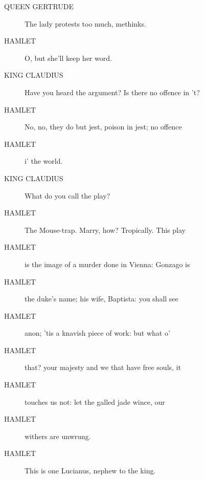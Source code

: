\documentclass{article}
\begin{document}
\begin{description}
            
\item[QUEEN GERTRUDE] The lady protests too much, methinks.
\end{description}
          
\begin{description}
            
\item[HAMLET] O, but she'll keep her word.
\end{description}
          
\begin{description}
            
\item[KING CLAUDIUS] Have you heard the argument? Is there no offence in 't?
\end{description}
          
\begin{description}
            
\item[HAMLET] No, no, they do but jest, poison in jest; no offence
\item[HAMLET] i' the world.
\end{description}
          
\begin{description}
            
\item[KING CLAUDIUS] What do you call the play?
\end{description}
          
\begin{description}
            
\item[HAMLET] The Mouse-trap. Marry, how? Tropically. This play
\item[HAMLET] is the image of a murder done in Vienna: Gonzago is
\item[HAMLET] the duke's name; his wife, Baptista: you shall see
\item[HAMLET] anon; 'tis a knavish piece of work: but what o'
\item[HAMLET] that? your majesty and we that have free souls, it
\item[HAMLET] touches us not: let the galled jade wince, our
\item[HAMLET] withers are unwrung.
\item[HAMLET] This is one Lucianus, nephew to the king.
\end{description}
          
\end{document}
